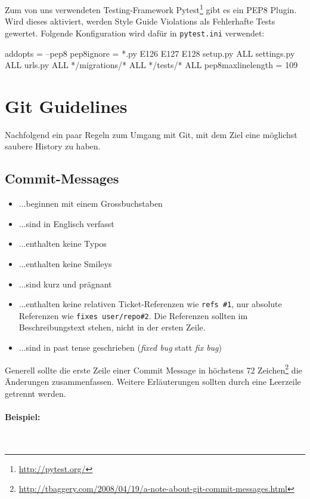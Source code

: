 Zum von uns verwendeten Testing-Framework
Pytest\footnote{\url{http://pytest.org/}} gibt es ein PEP8 Plugin. Wird dieses
aktiviert, werden Style Guide Violations als Fehlerhafte Tests gewertet.
Folgende Konfiguration wird dafür in \texttt{pytest.ini} verwendet:

\begin{inicode}
[pytest]
addopts = --pep8
pep8ignore =
    *.py E126 E127 E128
    setup.py ALL
    settings.py ALL
    urls.py ALL
    */migrations/* ALL
    */tests/* ALL
pep8maxlinelength = 109
\end{inicode}


\section{Git Guidelines}

Nachfolgend ein paar Regeln zum Umgang mit Git, mit dem Ziel eine möglichst
saubere History zu haben.

\subsection{Commit-Messages}

\begin{itemize}
	\item ...beginnen mit einem Grossbuchstaben
	\item ...sind in Englisch verfasst
	\item ...enthalten keine Typos
	\item ...enthalten keine Smileys
	\item ...sind kurz und prägnant
	\item ...enthalten keine relativen Ticket-Referenzen wie \texttt{refs \#1},
		nur absolute Referenzen wie \texttt{fixes user/repo\#2}. Die
		Referenzen sollten im Beschreibungstext stehen, nicht in der ersten Zeile.
	\item ...sind in past tense geschrieben (\textit{fixed bug} statt \textit{fix
		bug})
\end{itemize}

\noindent Generell sollte die erste Zeile einer Commit Message in höchstens 72
Zeichen\footnote{\url{http://tbaggery.com/2008/04/19/a-note-about-git-commit-messages.html}}
die Änderungen zusammenfassen. Weitere Erläuterungen sollten durch eine
Leerzeile getrennt werden.

\paragraph{Beispiel:} ~\\

